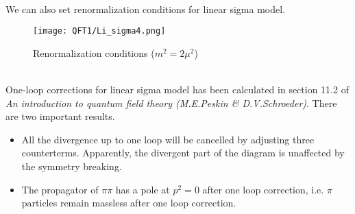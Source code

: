 \\
We can also set renormalization conditions for linear sigma model.
\begin{figure}[!h]
\centering
\texttt{[image: QFT1/Li\_sigma4.png]}
\caption{Renormalization conditions ($m^2 = 2\mu^2$)}
\end{figure}
\\
One-loop corrections for linear sigma model has been calculated in section 11.2 of \emph{An introduction to quantum field theory (M.E.Peskin \& D.V.Schroeder)}. There are two important results.
\begin{itemize}
\item All the divergence up to one loop will be cancelled by adjusting three counterterms. Apparently, the divergent part of the diagram is unaffected by the symmetry breaking.
\item The propagator of $\pi\pi$ has a pole at $p^2 = 0$ after one loop correction, i.e. $\pi$ particles remain massless after one loop correction.
\end{itemize}

